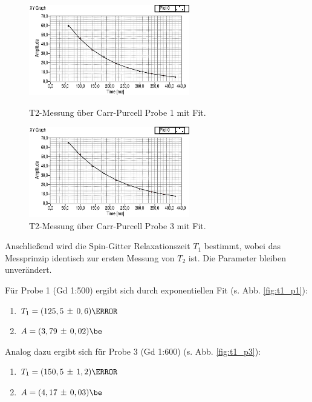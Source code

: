 \documentclass[a4paper]{scrartcl} %
\newcommand{\err}[2]{( #1 \, \pm \, #2 )} %
\begin{document}
\begin{figure}[H]
	\centering
	\parbox{70mm}{
		\centering
		\includegraphics[width=70mm]{./Resources/t2_p1_cp.eps}
		\caption{T2-Messung über Carr-Purcell Probe 1 mit Fit.}
		\label{fig:t2_p1_cp}
	}
	\hspace*{\fill}
	\parbox{70mm}{
		\centering
		\includegraphics[width=70mm]{./Resources/t2_p3_cp.eps}
		\caption{T2-Messung über Carr-Purcell Probe 3 mit Fit.}
		\label{fig:t2_p3_cp}
	}
\end{figure}
Anschließend wird die Spin-Gitter Relaxationszeit $T_1$ bestimmt, wobei das Messprinzip identisch zur ersten Messung von $T_2$ ist. Die Parameter bleiben unverändert.

Für Probe 1 (Gd 1:500) ergibt sich durch exponentiellen Fit (s. Abb. \ref{fig:t1_p1}):
\begin{enumerate}
	\item[] $T_1 = \err{125,5}{0,6} \ms$
	\item[] $A = \err{3,79}{0,02} \be$
\end{enumerate}
Analog dazu ergibt sich für Probe 3 (Gd 1:600) (s. Abb. \ref{fig:t1_p3}):
\begin{enumerate}
	\item[] $T_1 = \err{150,5}{1,2} \ms$
	\item[] $A = \err{4,17}{0,03} \be$
\end{enumerate}
\end{document}
